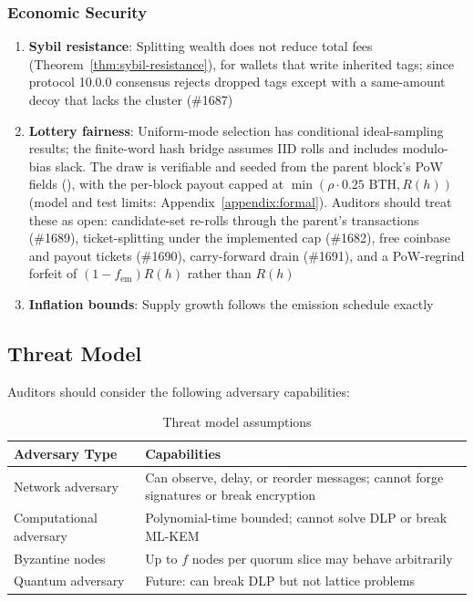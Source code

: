 \subsubsection{Economic Security}

\begin{enumerate}
  \item \textbf{Sybil resistance}: Splitting wealth does not reduce total fees
    (Theorem~\ref{thm:sybil-resistance}), for wallets that write inherited
    tags; since protocol 10.0.0 consensus rejects dropped tags except with a
    same-amount decoy that lacks the cluster (\#1687)
  \item \textbf{Lottery fairness}: Uniform-mode selection has conditional
    ideal-sampling results; the finite-word hash bridge assumes IID rolls
    and includes modulo-bias slack. The draw is verifiable and seeded from
    the parent block's PoW fields
    (), with the per-block payout capped at
    $\min(\rho \cdot 0.25\text{ BTH}, R(h))$
    (model and test limits: Appendix~\ref{appendix:formal}). Auditors should treat these as open:
    candidate-set re-rolls through the parent's transactions (\#1689),
    ticket-splitting under the implemented cap (\#1682), free coinbase and
    payout tickets (\#1690), carry-forward drain (\#1691), and a PoW-regrind
    forfeit of $(1-f_{\text{em}})R(h)$ rather than $R(h)$
  \item \textbf{Inflation bounds}: Supply growth follows the emission schedule
    exactly
\end{enumerate}

\subsection{Threat Model}

Auditors should consider the following adversary capabilities:

\begin{table}[h]
\centering
\caption{Threat model assumptions}
\label{tab:threat-model}
\begin{tabular}{@{}lp{9cm}@{}}
\toprule
\textbf{Adversary Type} & \textbf{Capabilities} \\
\midrule
Network adversary & Can observe, delay, or reorder messages; cannot forge
signatures or break encryption \\
Computational adversary & Polynomial-time bounded; cannot solve DLP or
break ML-KEM \\
Byzantine nodes & Up to $f$ nodes per quorum slice may behave arbitrarily \\
Quantum adversary & Future: can break DLP but not lattice problems \\
\bottomrule
\end{tabular}
\end{table}

